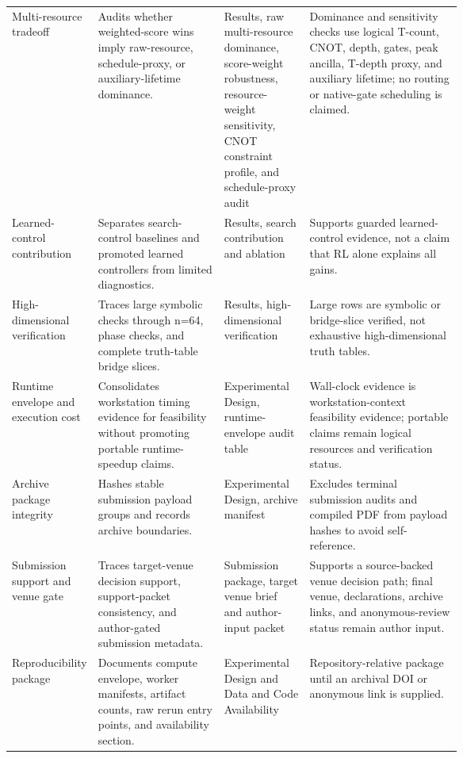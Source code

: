 \begin{tabularx}{\linewidth}{>{\raggedright\arraybackslash}p{0.18\linewidth}>{\raggedright\arraybackslash}p{0.29\linewidth}>{\raggedright\arraybackslash}p{0.19\linewidth}>{\raggedright\arraybackslash}X}
Multi-resource tradeoff & Audits whether weighted-score wins imply raw-resource, schedule-proxy, or auxiliary-lifetime dominance. & Results, raw multi-resource dominance, score-weight robustness, resource-weight sensitivity, CNOT constraint profile, and schedule-proxy audit & Dominance and sensitivity checks use logical T-count, CNOT, depth, gates, peak ancilla, T-depth proxy, and auxiliary lifetime; no routing or native-gate scheduling is claimed. \\
Learned-control contribution & Separates search-control baselines and promoted learned controllers from limited diagnostics. & Results, search contribution and ablation & Supports guarded learned-control evidence, not a claim that RL alone explains all gains. \\
High-dimensional verification & Traces large symbolic checks through n=64, phase checks, and complete truth-table bridge slices. & Results, high-dimensional verification & Large rows are symbolic or bridge-slice verified, not exhaustive high-dimensional truth tables. \\
Runtime envelope and execution cost & Consolidates workstation timing evidence for feasibility without promoting portable runtime-speedup claims. & Experimental Design, runtime-envelope audit table & Wall-clock evidence is workstation-context feasibility evidence; portable claims remain logical resources and verification status. \\
Archive package integrity & Hashes stable submission payload groups and records archive boundaries. & Experimental Design, archive manifest & Excludes terminal submission audits and compiled PDF from payload hashes to avoid self-reference. \\
Submission support and venue gate & Traces target-venue decision support, support-packet consistency, and author-gated submission metadata. & Submission package, target venue brief and author-input packet & Supports a source-backed venue decision path; final venue, declarations, archive links, and anonymous-review status remain author input. \\
Reproducibility package & Documents compute envelope, worker manifests, artifact counts, raw rerun entry points, and availability section. & Experimental Design and Data and Code Availability & Repository-relative package until an archival DOI or anonymous link is supplied. \\
\bottomrule
\end{tabularx}
